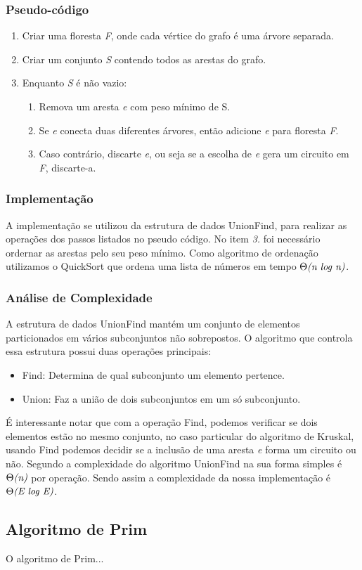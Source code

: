\documentclass[a4paper,12pt]{article}
\begin{document}
\subsubsection{Pseudo-código}
\begin{enumerate}
\item Criar uma floresta \emph{F}, onde cada vértice do grafo é uma árvore separada.
\item Criar um conjunto \emph{S} contendo todos as arestas do grafo.
\item Enquanto \emph{S} é não vazio:
	\begin{enumerate}
	\item Remova um aresta \emph{e} com peso mínimo de S.
	\item Se \emph{e} conecta duas diferentes árvores, então adicione \emph{e} para floresta \emph{F}.
	\item Caso contrário, discarte \emph{e}, ou seja se a escolha de \emph{e} gera um circuito em \emph{F}, discarte-a.
	\end{enumerate}
\end{enumerate}

\subsubsection{Implementação}
A implementação se utilizou da estrutura de dados UnionFind, para realizar as operações dos passos listados no pseudo código. No item \emph{3.} foi necessário ordernar as arestas pelo seu peso mínimo. Como algoritmo de ordenação utilizamos o QuickSort que ordena uma lista de números em tempo $\Theta\emph{(n log n)}$.

\subsubsection{Análise de Complexidade}
A estrutura de dados UnionFind mantém um conjunto de elementos particionados em vários subconjuntos não sobrepostos. O algoritmo que controla essa estrutura possui duas operações principais:
\begin{itemize}
\item Find: Determina de qual subconjunto um elemento pertence.
\item Union: Faz a união de dois subconjuntos em um só subconjunto.
\end{itemize}

É interessante notar que com a operação Find, podemos verificar se dois elementos estão no mesmo conjunto, no caso particular do algoritmo de Kruskal, usando Find podemos decidir se a inclusão de uma aresta \emph{e} forma um circuito ou não.
	Segundo \cite{Cormem} a complexidade do algoritmo UnionFind na sua forma simples é $\Theta\emph{(n)}$ por operação. Sendo assim a complexidade da nossa implementação é $\Theta\emph{(E log E)}$.
 

\subsection{Algoritmo de Prim}
O algoritmo de Prim...
	


\end{document}
